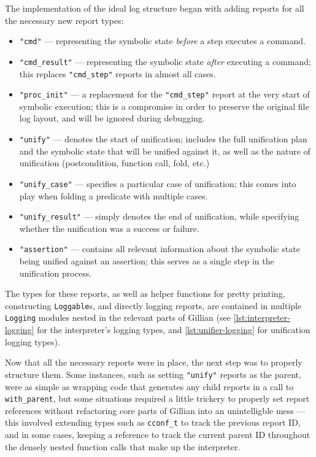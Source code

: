 The implementation of the ideal log structure began with adding reports for
all the necessary new report types:
\begin{itemize}
  \item \texttt{"cmd"} --- representing the symbolic state \textit{before} a
        step executes a command.
  \item \texttt{"cmd\_result"} --- representing the symbolic state
        \textit{after} executing a command; this replaces \texttt{"cmd\_step"}
        reports in almost all cases.
  \item \texttt{"proc\_init"} --- a replacement for the \texttt{"cmd\_step"}
        report at the very start of symbolic execution; this is a compromise
        in order to preserve the original file log layout, and will be ignored
        during debugging.
  \item \texttt{"unify"} --- denotes the start of unification; includes the
        full unification plan and the symbolic state that will be unified
        against it, as well as the nature of unification (postcondition,
        function call, fold, etc.)
  \item \texttt{"unify\_case"} --- specifies a particular case of unification;
        this comes into play when folding a predicate with multiple cases.
  \item \texttt{"unify\_result"} --- simply denotes the end of unification,
        while specifying whether the unification was a success or failure.
  \item \texttt{"assertion"} --- contains all relevant information about the
        symbolic state being unified against an assertion; this serves as a
        single step in the unification process.
\end{itemize}

The types for these reports, as well as helper functions for pretty printing,
constructing \texttt{Loggable}s, and directly logging reports, are contained
in multiple \texttt{Logging} modules nested in the relevant parts of Gillian
(see \autoref{lst:interpreter-logging} for the interpreter's logging types, and
\autoref{lst:unifier-logging} for unification logging types).

Now that all the necessary reports were in place, the next step was to properly
structure them. Some instances, such as setting \texttt{"unify"} reports as the
parent, were as simple as wrapping code that generates any child reports in a
call to \texttt{with\_parent}, but some situations required a little trickery
to properly set report references without refactoring core parts of Gillian into
an unintelligble mess --- this involved extending types such as
\texttt{cconf\_t} to track the previous report ID, and in some cases, keeping a
reference to track the current parent ID throughout the densely nested function
calls that make up the interpreter.

